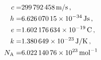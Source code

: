 \documentclass{article}
\begin{document}
\begin{align*}
    c=&\SI{ 299 792 458 }{m/s}\,,\\
    h=&\SI{ 6.62607015E-34 }{J s}\,,\\
     e=&\SI{1.602 176 634E-19}{C}\,,\\
     k=&\SI{1.380 649E-23}{J/K}\,,\\ 
     N_{\text{A}}=&\SI{6.022 140 76E23}{mol^{-1}}  
\end{align*}
\end{document}
